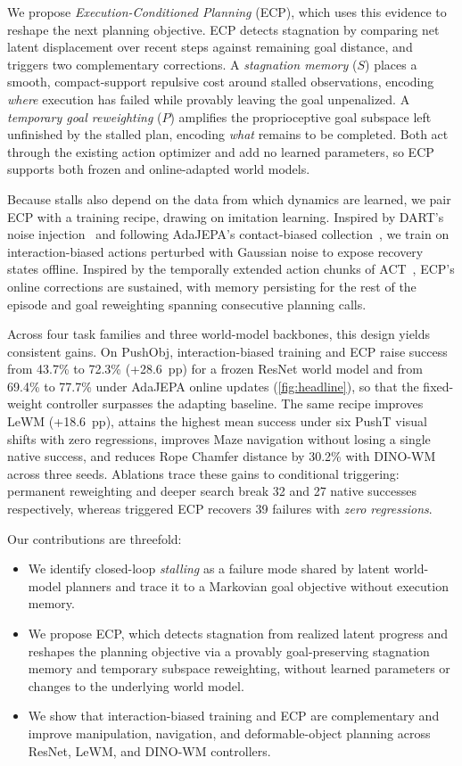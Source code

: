 We propose \emph{Execution-Conditioned Planning} (ECP), which uses this evidence to reshape the next planning objective. ECP detects stagnation by comparing net latent displacement over recent steps against remaining goal distance, and triggers two complementary corrections. A \emph{stagnation memory} ($S$) places a smooth, compact-support repulsive cost around stalled observations, encoding \emph{where} execution has failed while provably leaving the goal unpenalized. A \emph{temporary goal reweighting} ($P$) amplifies the proprioceptive goal subspace left unfinished by the stalled plan, encoding \emph{what} remains to be completed. Both act through the existing action optimizer and add no learned parameters, so ECP supports both frozen and online-adapted world models.

Because stalls also depend on the data from which dynamics are learned, we pair ECP with a training recipe, drawing on imitation learning. Inspired by DART's noise injection~\cite{laskey2017dart} and following AdaJEPA's contact-biased collection~\cite{wang2026adajepa}, we train on interaction-biased actions perturbed with Gaussian noise to expose recovery states offline. Inspired by the temporally extended action chunks of ACT~\cite{zhao2023act}, ECP's online corrections are sustained, with memory persisting for the rest of the episode and goal reweighting spanning consecutive planning calls.

Across four task families and three world-model backbones, this design yields consistent gains. On PushObj, interaction-biased training and ECP raise success from 43.7\% to 72.3\% (+28.6~pp) for a frozen ResNet world model and from 69.4\% to 77.7\% under AdaJEPA online updates (\cref{fig:headline}), so that the fixed-weight controller surpasses the adapting baseline. The same recipe improves LeWM (+18.6~pp), attains the highest mean success under six PushT visual shifts with zero regressions, improves Maze navigation without losing a single native success, and reduces Rope Chamfer distance by 30.2\% with DINO-WM across three seeds. Ablations trace these gains to conditional triggering: permanent reweighting and deeper search break 32 and 27 native successes respectively, whereas triggered ECP recovers 39 failures with \emph{zero regressions}.

Our contributions are threefold:
\begin{itemize}[leftmargin=*,itemsep=1pt,topsep=2pt,label=$\bullet$]
\item We identify closed-loop \emph{stalling} as a failure mode shared by latent world-model planners and trace it to a Markovian goal objective without execution memory.
\item We propose ECP, which detects stagnation from realized latent progress and reshapes the planning objective via a provably goal-preserving stagnation memory and temporary subspace reweighting, without learned parameters or changes to the underlying world model.
\item We show that interaction-biased training and ECP are complementary and improve manipulation, navigation, and deformable-object planning across ResNet, LeWM, and DINO-WM controllers.
\end{itemize}
